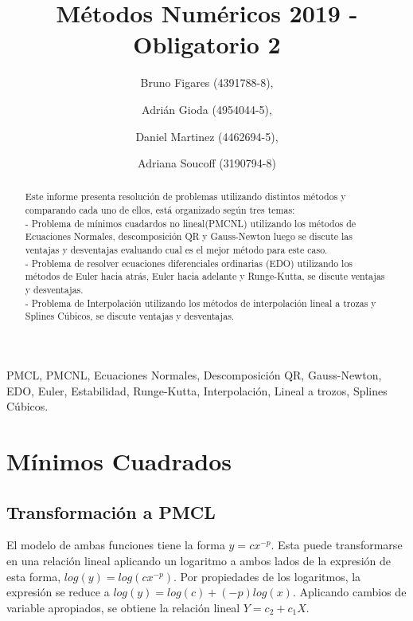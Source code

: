 \documentclass{endm}
\begin{document}
\begin{frontmatter}

\title{Métodos Numéricos 2019 - Obligatorio 2}

\author{Bruno Figares (4391788-8),}
\author{Adrián Gioda (4954044-5),}
\author{Daniel Martinez (4462694-5),}
\author{Adriana Soucoff (3190794-8)}

\address{Instituto de Matem\'atica y Estad\'istica\\ Facultad de Ingenier\'ia. Universidad de la Rep\'ublica\\ Montevideo, Uruguay}


\begin{abstract}
\setlength{\parindent}{12pt}
Este informe presenta resolución de problemas utilizando distintos métodos y comparando cada uno de ellos, está organizado según tres temas:\\
    - Problema de mínimos cuadardos no lineal(PMCNL) utilizando los métodos de Ecuaciones Normales, descomposición QR y Gauss-Newton luego se discute las ventajas y desventajas evaluando cual es el mejor método para este caso.\\
    - Problema de resolver ecuaciones diferenciales ordinarias (EDO) utilizando los métodos de Euler hacia atrás, Euler hacia adelante y Runge-Kutta, se discute ventajas y desventajas.\\
    - Problema de Interpolación utilizando los métodos de interpolación lineal a trozas y Splines Cúbicos, se discute ventajas y desventajas.
\end{abstract}

\begin{keyword}
PMCL, PMCNL, Ecuaciones Normales, Descomposición QR, Gauss-Newton, EDO, Euler, Estabilidad, Runge-Kutta, Interpolación, Lineal a trozos, Splines Cúbicos.
\end{keyword}

\end{frontmatter}


\section{Mínimos Cuadrados}
\subsection{Transformación a PMCL}
El modelo de ambas funciones tiene la forma $y = cx^{-p}$. Esta puede transformarse en una relación
lineal aplicando un logaritmo a ambos lados de la expresión de esta forma, $log(y) = log(cx^{-p})$.
Por propiedades de los logaritmos, la expresión se reduce a $log(y) = log(c) + (-p)log(x)$.
Aplicando cambios de variable apropiados, se obtiene la relación lineal $Y = c_2 + c_1X$.
\end{document}
